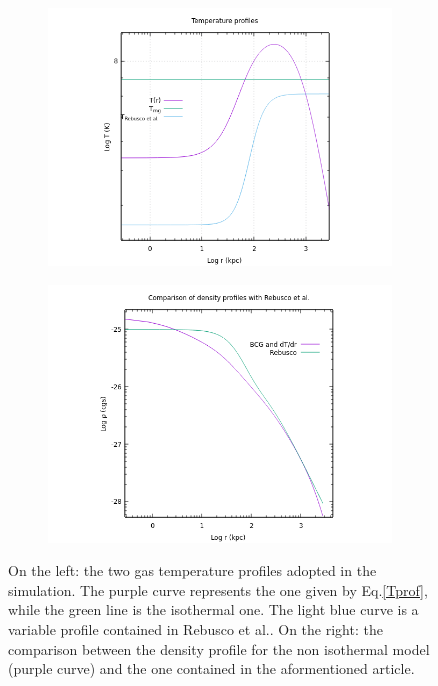 \documentclass{article}
\begin{document}
\begin{figure}[H]
	\begin{subfigure}{0.49\textwidth}
		\includegraphics[width=\textwidth]{temprofiles.png}
	\end{subfigure}
	\begin{subfigure}{0.49\textwidth}
		\includegraphics[width=\textwidth]{rebrho.png}
	\end{subfigure}
	\caption{On the left: the two gas temperature profiles adopted in the simulation. The purple curve represents the one given by Eq.\eqref{Tprof}, while the green line is the isothermal one. The light blue curve is a variable profile contained in Rebusco et al.\cite{rebusco}.
	On the right: the comparison between the density profile for the non isothermal model (purple curve) and the one contained in the aformentioned article. }
	\label{fig:tempprof}
\end{figure}
\end{document}
